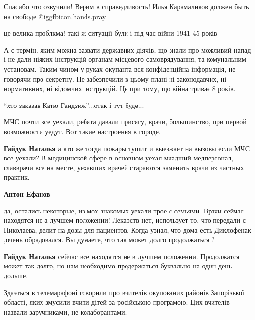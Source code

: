 \begin{itemize}
\begin{itemize}
\end{itemize} %


Спасибо что озвучили! Верим в справедливость! Илья Карамаликов должен быть на
свободе  @igg{fbicon.hands.pray}

це велика проблкма! такі ж ситуації були і під час війни 1941-45 років


А є термін, яким можна зазвати державних діячів, що знали про можливий напад і
не дали ніяких інструкцій органам місцевого самоврядування, та комунальним
установам. Таким чином у руках окупанта вся конфіденційна інформація, не
говорячи про секретну. Не забезпечили в цьому плані ні законодавчих, ні
нормативних, ні відомчих інструкцій. Це при тому, що війна триває 8 років.

\enquote{хто заказав Катю Гандзюк}...отак і тут буде...


МЧС почти все уехали, ребята давали присягу, врачи, большинство, при первой
возможности уедут. Вот такие настроения в городе.

\begin{itemize} %
\textbf{Гайдук Наталья} а кто же тогда пожары тушит и выезжает на вызовы если МЧС все уехали? В медицинской сфере в основном уехал младший медперсонал, главврачи все на месте, уехавших врачей стараются заменить врачи из частных практик.

\textbf{Антон Ефанов} 

да, остались некоторые, из мох знакомых уехали трое с семьями. Врачи сейчас
находятся не а лучшем положении! Лекарств нет, использует то, что передали с
Николаева, делит на дозы для пациентов. Когда узнал, что дома есть Диклофенак
,очень обрадовался. Вы думаете, что так может долго продолжаться ?

\textbf{Гайдук Наталья} сейчас все находятся не в лучшем положении. Продолжатся может так долго, но нам необходимо продержаться буквально на один день дольше.
\end{itemize} %


Здаэться в телемарафоні говорили про вчителів окупованих районів Запорізької
області, яких змусили вчити дітей за російською програмою. Цих вчителів назвали
заручниками, не колаборантами.


\end{itemize}

